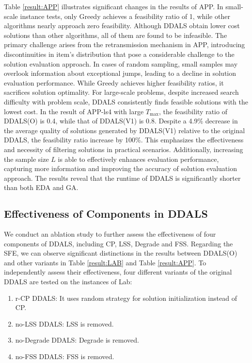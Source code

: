 \documentclass[lettersize,journal]{IEEEtran}
\begin{document}
Table \ref{result:APP} illustrates significant changes in the results of APP.  
In small-scale instance tests, only Greedy achieves a feasibility ratio of 1, while other algorithms nearly approach zero feasibility.
Although DDALS obtain lower cost solutions than other algorithms, all of them are found to be infeasible. 
The primary challenge arises from the retransmission mechanism in APP, introducing discontinuities in item's distribution that pose a considerable challenge to the solution evaluation approach.
In cases of random sampling, small samples may overlook information about exceptional jumps, leading to a decline in solution evaluation performance.
While Greedy achieves higher feasibility ratios, it sacrifices solution optimality. 
For large-scale problems, despite increased search difficulty with problem scale, DDALS consistently finds feasible solutions with the lowest cost. 
In the result of APP-ls4 with large $T_{\max}$, the feasibility ratio of DDALS(O) is 0.4, while that of DDALS(V1) is 0.8. 
Despite a 4.9\% decrease in the average quality of solutions generated by DDALS(V1) relative to the original DDALS, the feasibility ratio increase by 100\%.
This emphasizes the effectiveness and necessity of filtering solutions in practical scenarios. 
Additionally, increasing the sample size $L$ is able to effectively enhances evaluation performance, capturing more information and improving the accuracy of solution evaluation approach.
The results reveal that the runtime of DDALS is significantly shorter than both EDA and GA.

\subsection{Effectiveness of Components in DDALS}
We conduct an ablation study to further assess the effectiveness of four components of DDALS, including CP, LSS, Degrade and FSS.
Regarding the SFE, we can observe significant distinctions in the results between DDALS(O) and other variants in Table \ref{result:LAB} and Table \ref{result:APP}.
To independently assess their effectiveness, four different variants of the original DDALS are tested on the instances of Lab:

\begin{enumerate}
\item r-CP DDALS: It uses random strategy for solution initialization instead of CP. 
\item no-LSS DDALS: LSS is removed.
\item no-Degrade DDALS: Degrade is removed. 
\item no-FSS DDALS: FSS is removed. 
\end{enumerate}
\end{document}
